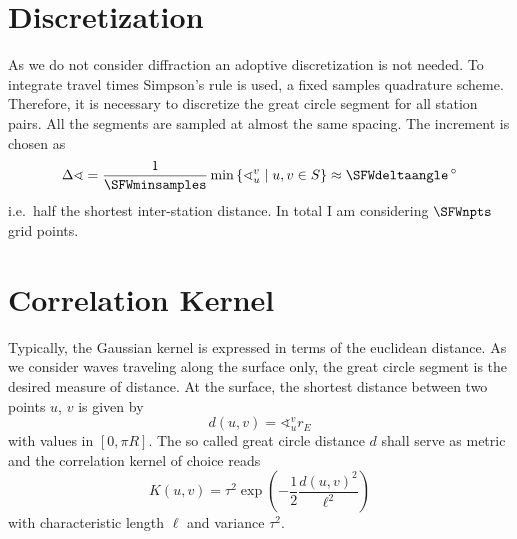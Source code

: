 \documentclass[11pt]{article}
\begin{document}
\section{Discretization}

As we do not consider diffraction an adoptive discretization is not needed.
To integrate travel times Simpson's rule is used, a fixed samples quadrature scheme.
Therefore, it is necessary to discretize the great circle segment for all station pairs.
All the segments are sampled at almost the same spacing.
The increment is chosen as
\begin{equation}
    \Delta\sphericalangle = \frac 1 \SFWminsamples \min\left\{ \sphericalangle_u^v \mid u,v \in S \right\}
    \approx \SFWdeltaangle \,{}^\circ
\end{equation}
i.e.~half the shortest inter-station distance.
In total I am considering $\SFWnpts$ grid points.


\section{Correlation Kernel}

Typically, the Gaussian kernel is expressed in terms of the euclidean distance.
As we consider waves traveling along the surface only, the great circle segment is the desired measure of distance.
At the surface, the shortest distance between two points $u$, $v$ is given by
\begin{equation}
    d(u,v) = \sphericalangle_u^v r_E
\end{equation}
with values in $[0, \pi R]$.
The so called great circle distance $d$ shall serve as metric and the correlation kernel of choice reads
\begin{equation}
    K(u,v) = \tau^2 \exp\!\left(-\frac 12 \frac{d(u,v)^2}{\ell^2}\right)
\end{equation}
with characteristic length $\ell$ and variance $\tau^2$.
\end{document}
